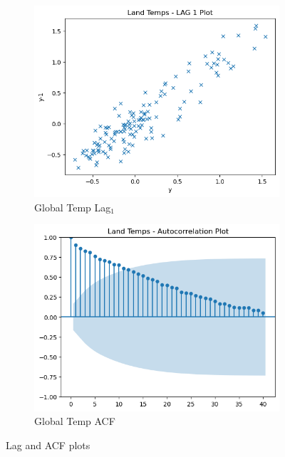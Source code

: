 \documentclass{article}
\begin{document}
\begin{figure}[H]
  \centering
  \begin{subfigure}[b]{0.45\textwidth}
    \includegraphics[width=\textwidth]{img/global_temp/lag_1.png}
    \caption{Global Temp Lag$_1$}
    \label{fig:global_templag}
  \end{subfigure}
  \hfill
  \begin{subfigure}[b]{0.45\textwidth}
    \includegraphics[width=\textwidth]{img/global_temp/acf.png}
    \caption{Global Temp ACF}
    \label{fig:global_tempacf}
  \end{subfigure}
  \caption{Lag and ACF plots}
  \label{fig:global_temp3}
\end{figure}
\end{document}
